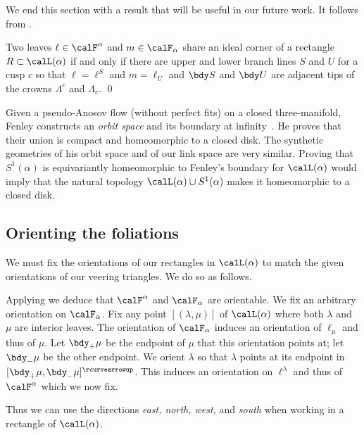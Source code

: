 \documentclass[12pt]{amsart}
\newcommand{\acw}{\rcurvearrowup}
\begin{document}
We end this section with a result that will be useful in our future work.  It follows from .

\begin{proposition}
\label{Prop:PerfectFits}
Two leaves $\ell \in \calF^\alpha$ and $m \in \calF_\alpha$ share an ideal corner of a rectangle $R \subset \calL(\alpha)$ if and only if there are upper and lower branch lines $S$ and $U$ for a cusp $c$ so that $\ell = \ell^S$ and $m = \ell_U$ and $\bdy S$ and $\bdy U$ are adjacent tips of the crowns $\Lambda^c$ and $\Lambda_c$.  \qed
\end{proposition}

\begin{remark}
Given a pseudo-Anosov flow (without perfect fits) on a closed three-manifold, Fenley constructs an \emph{orbit space} and its boundary at infinity~\cite[Theorem A]{Fenley12}.  He proves that their union is compact and homeomorphic to a closed disk.  The synthetic geometries of his orbit space and of our link space are very similar.
Proving that $S^1(\alpha)$ is equivariantly homeomorphic to Fenley's boundary for $\calL(\alpha)$ would imply that the natural topology $\calL(\alpha) \cup S^1(\alpha)$ makes it homeomorphic to a closed disk.
\end{remark}

\subsection{Orienting the foliations}
\label{Sec:OrientingFoliations}

We must fix the orientations of our rectangles in $\calL(\alpha)$ to match the given orientations of our veering triangles.  We do so as follows. 

Applying  we deduce that $\calF^\alpha$ and $\calF_\alpha$ are orientable.  We fix an arbitrary orientation on $\calF_\alpha$.  Fix any point $[(\lambda, \mu)]$ of $\calL(\alpha)$ where both $\lambda$ and $\mu$ are interior leaves.  The orientation of $\calF_\alpha$ induces an orientation of $\ell_\mu$ and thus of $\mu$.  Let $\bdy_+ \mu$ be the endpoint of $\mu$ that this orientation points at; let $\bdy_- \mu$ be the other endpoint.  We orient $\lambda$ so that $\lambda$ points at its endpoint in $[\bdy_+ \mu, \bdy_- \mu]^\acw$.  This induces an orientation on $\ell^\lambda$ and thus of $\calF^\alpha$ which we now fix.  

Thus we can use the directions \emph{east, north, west,} and \emph{south} when working in a rectangle of $\calL(\alpha)$. 
\end{document}
